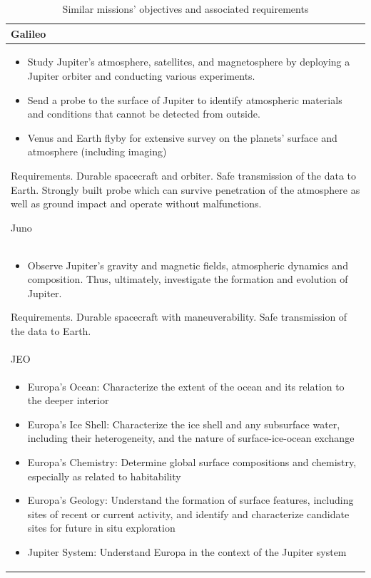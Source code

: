 \begin{longtable}{p{\textwidth}}
  \caption{Similar missions' objectives and associated requirements}
  \\

  Galileo \\* \midrule

  \begin{itemize}
  \item Study Jupiter’s atmosphere, satellites, and magnetosphere by
    deploying a Jupiter orbiter and conducting various experiments.
  \item Send a probe to the surface of Jupiter to identify atmospheric
    materials and conditions that cannot be detected from outside.
  \item Venus and Earth flyby for extensive survey on the planets’
    surface and atmosphere (including imaging)
  \end{itemize}

  Requirements. Durable spacecraft and orbiter. Safe transmission of
  the data to Earth.  Strongly built probe which can survive
  penetration of the atmosphere as well as ground impact and operate
  without malfunctions.

  Juno \\* \midrule

  \begin{itemize}
  \item Observe Jupiter's gravity and magnetic fields, atmospheric
    dynamics and composition. Thus, ultimately, investigate the
    formation and evolution of Jupiter.
  \end{itemize}

  Requirements. Durable spacecraft with maneuverability. Safe
  transmission of the data to Earth. \\

  JEO \\* \midrule

  \begin{itemize}
  \item Europa’s Ocean: Characterize the extent of the ocean and its
    relation to the deeper interior
  \item Europa’s Ice Shell: Characterize the ice shell and any
    subsurface water, including their heterogeneity, and the nature of
    surface-ice-ocean exchange
  \item Europa’s Chemistry: Determine global surface compositions and
    chemistry, especially as related to habitability
  \item Europa’s Geology: Understand the formation of surface
    features, including sites of recent or current activity, and
    identify and characterize candidate sites for future in situ
    exploration
  \item Jupiter System: Understand Europa in the context of the
    Jupiter system
  \end{itemize} \\


\end{longtable}
